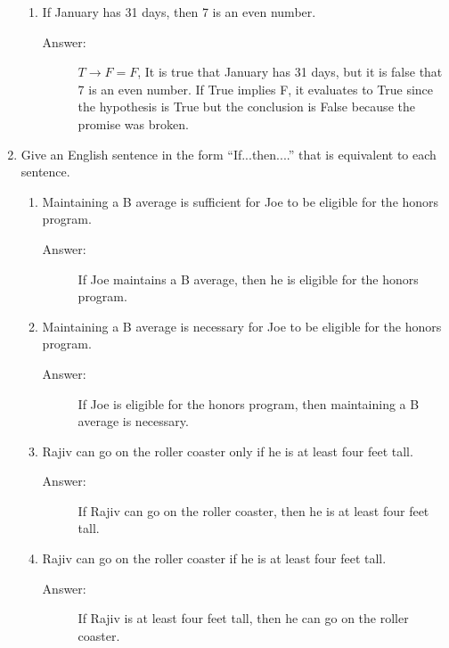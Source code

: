 \documentclass[12pt, oneside]{article}
\begin{document}
\begin{enumerate}
\begin{enumerate}
    \item If January has 31 days, then 7 is an even number.
    \begin{description}
        \item[Answer:] $T \rightarrow F = F$, It is true that January has 31 days, but it is false that 7 is an even number. If True implies F, it evaluates to True since the hypothesis is True but the conclusion is False because the promise was broken.
    \end{description}
\end{enumerate}
\newpage
\item Give an English sentence in the form ``If...then....'' that is equivalent to each sentence.
\begin{enumerate}
    \item Maintaining a B average is sufficient for Joe to be eligible for the honors program.
    \begin{description}
        \item[Answer:] If Joe maintains a B average, then he is eligible for the honors program.
    \end{description}
    
    \item Maintaining a B average is necessary for Joe to be eligible for the honors program.
    \begin{description}
        \item[Answer:] If Joe is eligible for the honors program, then maintaining a B average is necessary.
    \end{description}
    
    \item Rajiv can go on the roller coaster only if he is at least four feet tall.
    \begin{description}
        \item[Answer:] If Rajiv can go on the roller coaster, then he is at least four feet tall.
    \end{description}
    
    \item Rajiv can go on the roller coaster if he is at least four feet tall.
    \begin{description}
        \item[Answer:] If Rajiv is at least four feet tall, then he can go on the roller coaster.
    \end{description}
\end{enumerate}



\end{enumerate}
\end{document}
